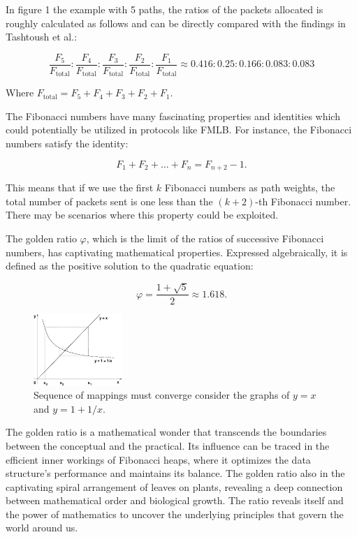 \documentclass[12pt]{article}
\begin{document}
In figure 1 the example with 5 paths, the ratios of the packets allocated is roughly calculated as follows and can be directly compared with the findings in Tashtoush et al.:

\[
\frac{F_5}{F_{\text{total}}} : \frac{F_4}{F_{\text{total}}} : \frac{F_3}{F_{\text{total}}} : \frac{F_2}{F_{\text{total}}} : \frac{F_1}{F_{\text{total}}} \approx 0.416 : 0.25 : 0.166 : 0.083 : 0.083
\]

Where $F_{\text{total}} = F_5 + F_4 + F_3 + F_2 + F_1$.

The Fibonacci numbers have many fascinating properties and identities which could potentially be utilized in protocols like FMLB. For instance, the Fibonacci numbers satisfy the identity:

\begin{equation}
F_1 + F_2 + \ldots + F_n = F_{n+2} - 1.
\end{equation}

This means that if we use the first $k$ Fibonacci numbers as path weights, the total number of packets sent is one less than the $(k+2)$-th Fibonacci number. There may be scenarios where this property could be exploited.

The golden ratio $\varphi$, which is the limit of the ratios of successive Fibonacci numbers, has captivating mathematical properties. Expressed algebraically, it is defined as the positive solution to the quadratic equation:


\begin{equation}
\varphi = \frac{1 + \sqrt{5}}{2} \approx 1.618.
\end{equation}

\begin{figure}[ht]
  \centering
  \includegraphics[width=0.3\textwidth]{./images/Spiral_Graph.jpg}
  \caption{Sequence of mappings must converge consider the graphs of $y=x$ and $y=1+1/x.$}
  \label{fig:spiral_graph}
  \end{figure}

The golden ratio is a mathematical wonder that transcends the boundaries between the conceptual and the practical. Its influence can be traced in the efficient inner workings of Fibonacci heaps, where it optimizes the data structure's performance and maintains its balance. The golden ratio also in the captivating spiral arrangement of leaves on plants, revealing a deep connection between mathematical order and biological growth. The ratio reveals itself and the power of mathematics to uncover the underlying principles that govern the world around us.
\end{document}
